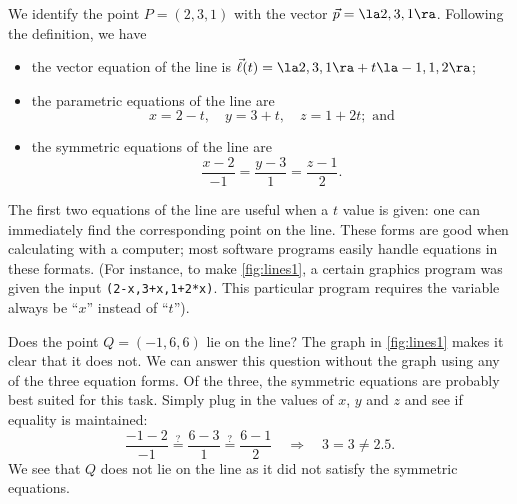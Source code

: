 {We identify the point $P=(2,3,1)$ with the vector $\vec p =\la 2,3,1\ra$. Following the definition, we have
\begin{itemize}
	\item the vector equation of the line is $\vec\ell(t) = \la 2,3,1\ra + t\la -1,1,2\ra$;
	\item	the parametric equations of the line are
	$$x = 2-t,\quad y = 3+t,\quad z = 1+2t; \text{ and}$$
	\item	the symmetric equations of the line are
	$$\frac{x-2}{-1}=\frac{y-3}{1} = \frac{z-1}{2}.$$
\end{itemize}

The first two equations of the line are useful when a $t$ value is given: one can immediately find the corresponding point on the line. These forms are good when calculating with a computer; most software programs easily handle equations in these formats. (For instance, to make \autoref{fig:lines1}, a certain graphics program was given the input \texttt{(2-x,3+x,1+2*x)}. This particular program requires the variable always be ``$x$'' instead of ``$t$'').

Does the point $Q = (-1,6,6)$ lie on the line? The graph in \autoref{fig:lines1} makes it clear that it does not. We can answer this question without the graph using any of the three equation forms. Of the three, the symmetric equations are probably best suited for this task. Simply plug in the values of $x$, $y$ and $z$ and see if equality is maintained:
$$ \frac{-1-2}{-1} \stackrel{?}{=} \frac{6-3}{1} \stackrel{?}{=} \frac{6-1}{2} \quad \Rightarrow \quad 3=3\neq2.5.$$
We see that $Q$ does not lie on the line as it did not satisfy the symmetric equations.}

